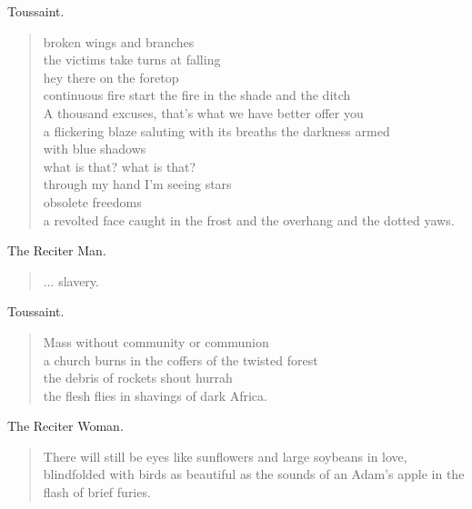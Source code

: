 \documentclass[letterpaper,article,12pt,oneside,notitlepage]{memoir}
\begin{document}
\begin{center}Toussaint.\end{center}

\begin{verse}
broken wings and branches \\
the victims take turns at falling \\
hey there on the foretop \\
continuous fire start the fire in the shade and the ditch \\
A thousand excuses, that's what we have better offer you \\
a flickering blaze saluting with its breaths the darkness armed \\
with blue shadows \\
what is that? what is that? \\
through my hand I'm seeing stars \\
obsolete freedoms \\
a revolted face caught in the frost and the overhang and the dotted yaws. \\
\end{verse}

\begin{center}The Reciter Man.\end{center}

\begin{verse}
... slavery. \\
\end{verse}

\begin{center}Toussaint.\end{center}

\begin{verse}
Mass without community or communion \\
a church burns in the coffers of the twisted forest \\
the debris of rockets shout hurrah \\
the flesh flies in shavings of dark Africa. \\
\end{verse}

\begin{center}The Reciter Woman.\end{center}

\begin{verse}
There will still be eyes like sunflowers and large soybeans in love, blindfolded with birds as beautiful as the sounds of an Adam's apple in the flash of brief furies. \\
\end{verse}
\end{document}
